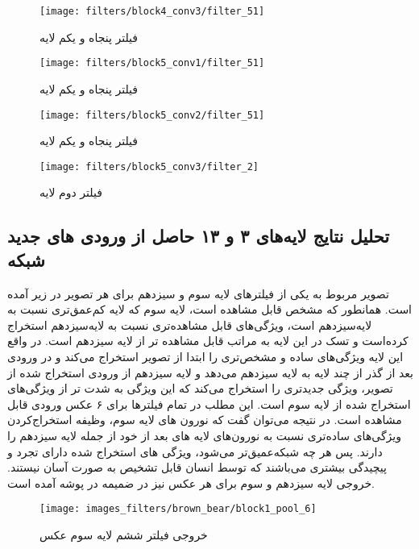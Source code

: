 \documentclass{article}
\begin{document}
\begin{figure}[H]
	\centerline{\texttt{[image: filters/block4\_conv3/filter\_51]}}
	\caption{فیلتر پنجاه و یکم لایه }
\end{figure}

\begin{figure}[H]
	\centerline{\texttt{[image: filters/block5\_conv1/filter\_51]}}
	\caption{فیلتر پنجاه و یکم لایه }
\end{figure}

\begin{figure}[H]
	\centerline{\texttt{[image: filters/block5\_conv2/filter\_51]}}
	\caption{فیلتر پنجاه و یکم لایه }
\end{figure}


\begin{figure}[H]
	\centerline{\texttt{[image: filters/block5\_conv3/filter\_2]}}
	\caption{فیلتر دوم لایه }
\end{figure}

\subsection{تحلیل نتایج لایه‌های ۳ و ۱۳ حاصل از ورودی های جدید شبکه}
تصویر مربوط به یکی از فیلتر‌های لایه سوم و سیزدهم برای هر تصویر در زیر آمده است. همانطور که مشخص قابل مشاهده است، لایه سوم که لایه کم‌عمق‌تری نسبت به لایه‌سیزدهم است، ویژگی‌های قابل مشا‌هده‌تری نسبت به لایه‌سیزدهم استخراج کرده‌است و تسک  در این لایه به مراتب قابل مشاهده تر از لایه سیزدهم است. در واقع این لایه ویژگی‌های ساده‌ و مشخص‌تری را ابتدا از تصویر استخراج می‌کند و در ورودی بعد از گذر از چند لایه به لایه سیزدهم می‌دهد و لایه سیزدهم از ورودی استخراج شده از تصویر، ویژگی جدید‌تری را استخراج می‌کند که این ویژگی به شدت  تر از ویژگی‌های استخراج شده از لایه‌ سوم است. این مطلب در تمام فیلتر‌ها برای ۶ عکس ورودی قابل مشاهده است. در نتیجه می‌توان گفت که نورون های لایه سوم، وظیفه استخراج‌کردن ویژگی‌های ساده‌تری نسبت به نورون‌های لایه های بعد از خود از جمله لایه سیزدهم را دارند. پس هر چه شبکه‌عمیق‌تر می‌شود، ویژگی های استخراج شده دارای تجرد و پیچیدگی بیشتری می‌باشند که توسط انسان قابل تشخیص به صورت آسان نیستند. خروجی لایه سیزدهم و سوم برای هر عکس نیز در ضمیمه در پوشه  آمده است.
\begin{figure}[H]
	\centerline{\texttt{[image: images\_filters/brown\_bear/block1\_pool\_6]}}
	\caption{خروجی فیلتر ششم لایه سوم عکس }
\end{figure}
\end{document}
